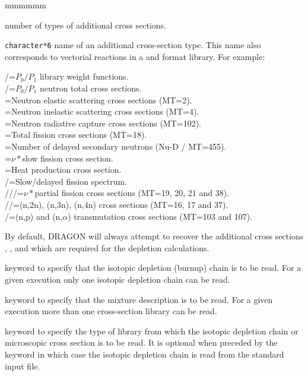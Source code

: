 \begin{ListeDeDescription}{mmmmmm}
\item[\dusa{nedit}] number of types of additional cross sections.

\item[\dusa{HEDIT}] {\tt character*6} name of an additional
cross-section type. This name also corresponds to vectorial reactions in a
 and
 format library. For example:

/=$P_0/P_1$ library weight functions.\\
/=$P_0/P_1$ neutron total cross sections.\\
=Neutron elastic scattering cross sections (MT=2).\\
=Neutron inelastic scattering cross sections (MT=4).\\
=Neutron radiative capture cross sections (MT=102).\\
=Total fission cross sections (MT=18).\\
=Number of delayed secondary neutrons (Nu-D / MT=455).\\
=$\nu*$slow fission cross section.\\
=Heat production cross section.\\
/=Slow/delayed fission spectrum.\\
///=$\nu*$partial fission cross sections (MT=19, 20, 21 and 38).\\ 
//=(n,2n), (n,3n), (n,4n) cross sections (MT=16, 17 and 37).\\
/=(n,p) and (n,$\alpha$) transmutation cross sections (MT=103 and 107).

By default, DRAGON will always attempt to recover the additional cross sections
, ,  and  which are required for the depletion
calculations. 

\item[\moc{DEPL}] keyword to specify that the isotopic depletion (burnup)
chain is to be read. For a given  execution only one isotopic
depletion chain can be read. 

\item[\moc{MIXS}] keyword to specify that the mixture description is to be
read. For a given  execution more than one cross-section library can
be read. 

\item[\moc{LIB:}] keyword to specify the type of library from which the
isotopic depletion chain or microscopic cross section is to be read. It is
optional when preceded by the keyword  in which case the isotopic
depletion chain is read from the standard input file. 


\end{ListeDeDescription}
